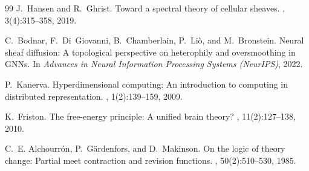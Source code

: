 \documentclass[11pt]{article}
\begin{document}
\begin{thebibliography}{99}
J.~Hansen and R.~Ghrist.
\newblock Toward a spectral theory of cellular sheaves.
, 3(4):315--358, 2019.

C.~Bodnar, F.~Di~Giovanni, B.~Chamberlain, P.~Li\`{o}, and M.~Bronstein.
\newblock Neural sheaf diffusion: A topological perspective on heterophily and oversmoothing in GNNs.
\newblock In {\em Advances in Neural Information Processing Systems (NeurIPS)}, 2022.

P.~Kanerva.
\newblock Hyperdimensional computing: An introduction to computing in distributed representation.
, 1(2):139--159, 2009.

K.~Friston.
\newblock The free-energy principle: A unified brain theory?
, 11(2):127--138, 2010.

C.~E. Alchourr\'{o}n, P.~G\"{a}rdenfors, and D.~Makinson.
\newblock On the logic of theory change: Partial meet contraction and revision functions.
, 50(2):510--530, 1985.

\end{thebibliography}
\end{document}

